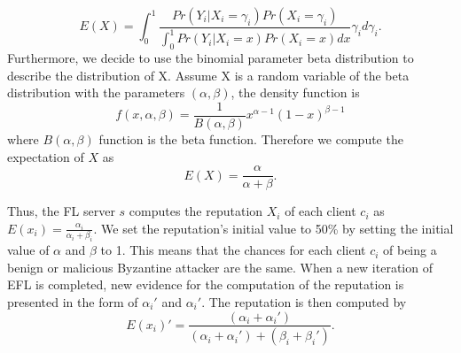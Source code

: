 \documentclass[journal]{IEEEtran}
\begin{document}
\begin{equation}
  E(X)=\int_{0}^{1}\frac{Pr\left ( Y_{i}|X_{i}=\gamma_{i} \right )Pr(X_{i}=\gamma_{i})}{\int_{0}^{1}Pr\left ( Y_{i}|X_{i}=x \right )Pr(X_{i}=x)dx}\gamma_{i}d\gamma_{i}\label{equation_3}.
\end{equation}
Furthermore, we decide to use the binomial parameter beta distribution to describe the distribution of X. Assume X is a random variable of the beta distribution with the parameters $(\alpha, \beta)$, the density function is
\begin{equation}
  f(x,\alpha,\beta)=\frac{1}{B(\alpha,\beta)}x^{\alpha-1}(1-x)^{\beta-1}\label{equation-4}
\end{equation}
where $B(\alpha, \beta)$ function is the beta function. Therefore we compute the expectation of $X$ as
\begin{equation}
  E(X)=\frac{\alpha}{\alpha+\beta}.
\end{equation}

Thus, the FL server ${s}$ computes the reputation $X_i$ of each client ${c_{i}}$ as ${E(x_{i})=\frac{\alpha_{i}}{\alpha_{i}+\beta_{i}}}$. We set the reputation's initial value to 50\% by setting the initial value of $\alpha$ and $\beta$ to 1. This means that the chances for each client $c_ i$ of being a benign or malicious Byzantine attacker are the same. When a new iteration of EFL is completed, new evidence for the computation of the reputation is presented in the form of ${\alpha_{i}}'$ and ${\alpha_{i}}'$. The reputation is then computed by
\begin{equation}
  {E(x_{i})}'=\frac{(\alpha_{i}+{\alpha_{i}}')}{(\alpha_{i}+{\alpha_{i}}')+(\beta_{i}+{\beta_{i}}')}.
\end{equation}
\end{document}
